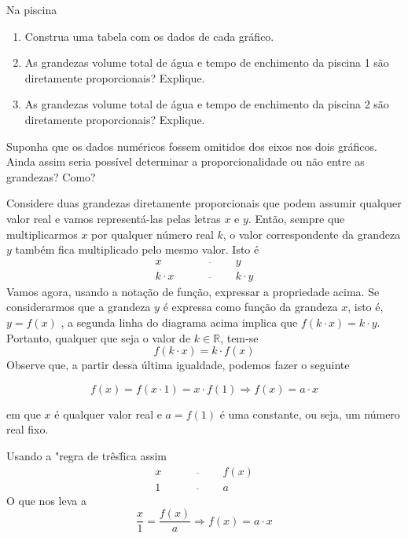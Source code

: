\begin{task}{Na piscina}
\begin{enumerate}
\item {} 
Construa uma tabela com os dados de cada gráfico.

\item {} 
As grandezas volume total de água e tempo de enchimento da piscina 1 são diretamente proporcionais? Explique.

\item {} 
As grandezas volume total de água e tempo de enchimento da piscina 2 são diretamente proporcionais? Explique.

\end{enumerate}
\end{task}



\begin{reflection}

Suponha que os dados numéricos fossem omitidos dos eixos nos dois gráficos. Ainda assim seria possível determinar a proporcionalidade ou não entre as grandezas? Como?
\end{reflection}


\label{\detokenize{AF107-1::doc}}\label{\detokenize{AF107-1:organizando-as-ideias-funcao-linear}}
Considere duas grandezas diretamente proporcionais que podem assumir qualquer valor real e vamos representá-las pelas letras \(x\) e \(y\). Então, sempre que multiplicarmos \(x\) por qualquer número real \(k\), o valor correspondente da grandeza \(y\) também fica multiplicado pelo mesmo valor. Isto é
\[\begin{array}{ccc}
x\quad &\overline{\quad \quad \quad}&  y \\
k\cdot x \quad &\overline{\quad \quad \quad}&  k\cdot y
  \end{array}\]
Vamos agora, usando a notação de função, expressar a propriedade acima. Se considerarmos que a grandeza \(y\) é expressa como função da grandeza \(x\), isto é, \(y=f(x)\) ,  a segunda linha do diagrama acima implica que \(f(k\cdot x)=k\cdot y\). Portanto, qualquer que seja o valor de \(k\in\mathbb{R}\), tem-se
\[ f(k\cdot x)= k\cdot f(x) \]
Observe que, a partir dessa última igualdade, podemos fazer o seguinte

\[ f(x)=f(x\cdot 1)= x\cdot f(1) \Longrightarrow f(x)=a\cdot x\]

em que \(x\) é qualquer valor real e \(a=f(1)\) é uma constante, ou seja, um número real fixo.

\begin{observation}{}
Usando a "regra de três\" fica assim
\[\begin{array}{ccc}
x\quad &\overline{\quad \quad \quad}&  f(x) \\
1 \quad &\overline{\quad \quad \quad}&  a
  \end{array}\]
O que nos leva a
\begin{equation*}
\dfrac x1 = \dfrac {f(x)}a \Longrightarrow f(x) = a\cdot x
\end{equation*}
\end{observation}

